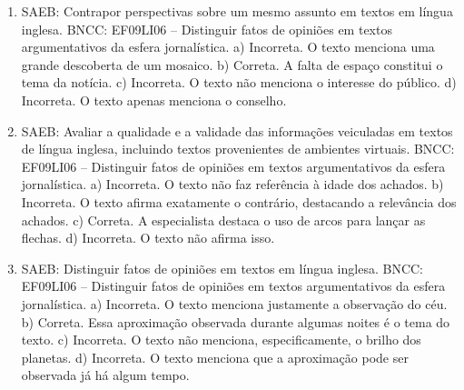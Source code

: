 \begin{enumerate}
\item
SAEB: Contrapor perspectivas sobre um mesmo assunto em textos em língua
inglesa.
BNCC: EF09LI06 -- Distinguir fatos de opiniões em textos argumentativos
da esfera jornalística.
a) Incorreta. O texto menciona uma grande descoberta de um mosaico.
b) Correta. A falta de espaço constitui o tema da notícia.
c) Incorreta. O texto não menciona o interesse do público.
d) Incorreta. O texto apenas menciona o conselho.

\item
SAEB: Avaliar a qualidade e a validade das informações veiculadas em
textos de língua inglesa, incluindo textos provenientes de ambientes
virtuais.
BNCC: EF09LI06 -- Distinguir fatos de opiniões em textos argumentativos
da esfera jornalística.
a) Incorreta. O texto não faz referência à idade dos achados.
b) Incorreta. O texto afirma exatamente o contrário, destacando a
relevância dos achados.
c) Correta. A especialista destaca o uso de arcos para lançar as
flechas.
d) Incorreta. O texto não afirma isso.

\item
SAEB: Distinguir fatos de opiniões em textos em língua inglesa.
BNCC: EF09LI06 -- Distinguir fatos de opiniões em textos argumentativos
da esfera jornalística.
a) Incorreta. O texto menciona justamente a observação do céu.
b) Correta. Essa aproximação observada durante algumas noites é o tema
do texto.
c) Incorreta. O texto não menciona, especificamente, o brilho dos planetas.
d) Incorreta. O texto menciona que a aproximação pode ser observada
já há algum tempo.
\end{enumerate}


